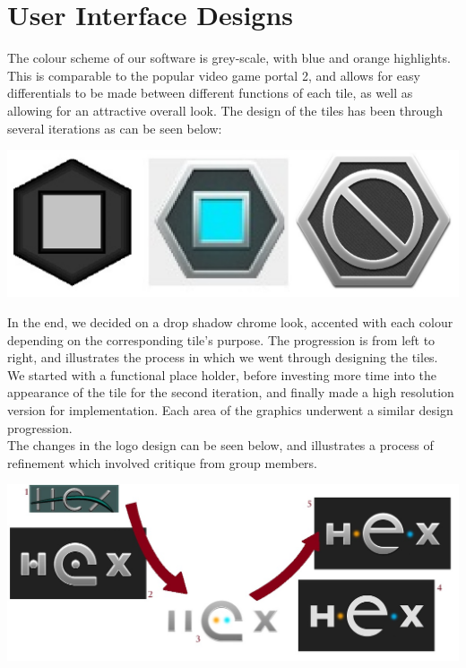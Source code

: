 \documentclass[10pt,a4paper]{article}
\begin{document}
\pagebreak
\section{User Interface Designs}
The colour scheme of our software is grey-scale, with blue and orange highlights. This is comparable to the popular video game portal 2, and allows for easy differentials to be made between different functions of each tile, as well as allowing for an attractive overall look. The design of the tiles has been through several iterations as can be seen below:\\
\begin{center}
\includegraphics[scale=0.3]{tileprogression.jpg}
\end{center}

In the end, we decided on a drop shadow chrome look, accented with each colour depending on the corresponding tile's purpose. The progression is from left to right, and illustrates the process in which we went through designing the tiles. We started with a functional place holder, before investing more time into the appearance of the tile for the second iteration, and finally made a high resolution version for implementation. Each area of the graphics underwent a similar design progression.
\\
The changes in the logo design can be seen below, and illustrates a process of refinement which involved critique from group members.
\begin{center}
\includegraphics[scale=0.5]{logoprogression.jpg}
\end{center}
\end{document}
